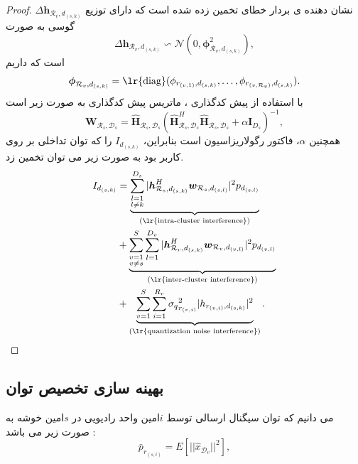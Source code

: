 \begin{proof}
$\Delta \boldsymbol{h}_{\mathcal{R}_v,d_{(s,k)}}$
نشان دهنده ی بردار خطای تخمین زده شده است که دارای توزیع گوسی به صورت
$$\Delta \boldsymbol{h}_{\mathcal{R}_v,d_{(s,k)}}\backsim \mathcal{N}(0,\boldsymbol{\phi}_{\mathcal{R}_v,d_{(s,k)}}^2),$$
است که  داریم 
$$\boldsymbol{\phi}_{\mathcal{R}_v,d_{(s,k)}} = \text{\lr{diag}}(\phi_{r_{(v,1)},d_{(s,k)}},\ldots,\phi_{r_{(v,\mathcal{R}_v)},d_{(s,k)}}).$$
با استفاده از پیش کدگذاری ، ماتریس پیش کدگذاری به صورت زیر است \cite{digCom}
\begin{equation}
\boldsymbol{W}_{\mathcal{R}_s,\mathcal{D}_s} = \hat{\boldsymbol{H}}_{\mathcal{R}_s,\mathcal{D}_s}(\hat{\boldsymbol{H}}_{\mathcal{R}_s,\mathcal{D}_s}^H \hat{\boldsymbol{H}}_{\mathcal{R}_s,\mathcal{D}_s}+ \alpha \boldsymbol{I}_{{D}_s})^{-1},
\end{equation} 
همچنین  $\alpha$، فاکتور رگولاریزاسیون است
بنابراین، $I_{d_{(s,k)}}$ را که توان تداخلی بر روی کاربر بود به صورت زیر می توان تخمین زد.
\begin{equation}\label{6}
\begin{split}
I_{d_{(s,k)}} &=  \underbrace{\sum_{\substack{l=1 \\ l\neq k}}^{{D}_s} |\boldsymbol{h}_{\mathcal{R}_s, d_{(s,k)}}^H \boldsymbol{w}_{\mathcal{R}_{s},d_{(s,l)}}|^2  p_{d_{(s,l)}}}_{\text{(\lr{intra-cluster interference})}}\\
&+\underbrace{\sum_{\substack{v=1 \\ v\neq s}}^{S} \sum_{l=1}^{{D}_v} |\boldsymbol{h}_{\mathcal{R}_v, d_{(s,k)}}^H \boldsymbol{w}_{\mathcal{R}_{v},d_{(v,l)}}|^2 p_{d_{(v,l)}}}_{\text{(\lr{inter-cluster interference})}}\\
& +\underbrace{ \sum_{v=1}^{S} \sum_{i=1}^{{R}_v} {\sigma_q}_{r_{(v,i)}}^2  |h_{r_{(v,i)}, d_{(s,k)}}|^2 }_{\text{(\lr{quantization noise interference})}}.
\end{split}
\end{equation}
\end{proof}
\subsection{بهینه سازی تخصیص توان}
می دانیم که توان سیگنال ارسالی توسط  $i$امین واحد رادیویی در $s$امین خوشه  به صورت زیر می باشد : 
\begin{equation} \label{eq_pow2}
\bar{p}_{r_{(s,i)}} = \mathit{E}[|| \hat{x}_{\mathcal{D}_v} ||^2],
\end{equation}

